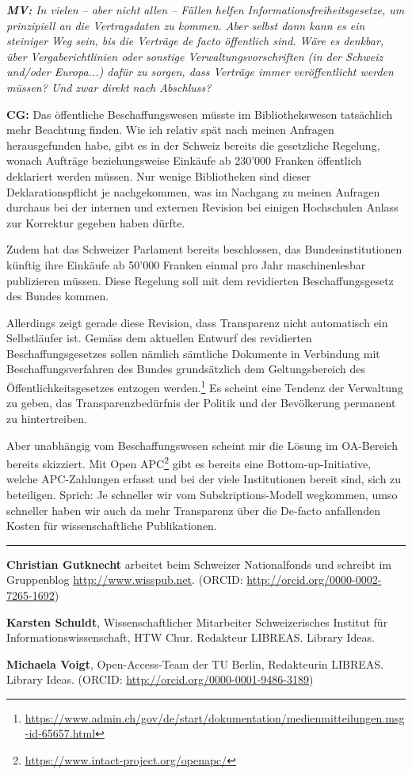 \documentclass[a4paper,
fontsize=11pt,
oneside,
numbers=noperiodatend,
parskip=half-,
bibliography=totoc,
final
]{scrartcl}
\begin{document}
\emph{\textbf{MV:} In vielen -- aber nicht allen -- Fällen helfen
Informationsfreiheitsgesetze, um prinzipiell an die Vertragsdaten zu
kommen. Aber selbst dann kann es ein steiniger Weg sein, bis die
Verträge de facto öffentlich sind. Wäre es denkbar, über
Vergaberichtlinien oder sonstige Verwaltungsvorschriften (in der Schweiz
und/oder Europa...) dafür zu sorgen, dass Verträge immer veröffentlicht
werden müssen? Und zwar direkt nach Abschluss?}

\textbf{CG:} Das öffentliche Beschaffungswesen müsste im
Bibliothekswesen tatsächlich mehr Beachtung finden. Wie ich relativ spät
nach meinen Anfragen herausgefunden habe, gibt es in der Schweiz bereits
die gesetzliche Regelung, wonach Aufträge beziehungsweise Einkäufe ab
230'000 Franken öffentlich deklariert werden müssen. Nur wenige
Bibliotheken sind dieser Deklarationspflicht je nachgekommen, was im
Nachgang zu meinen Anfragen durchaus bei der internen und externen
Revision bei einigen Hochschulen Anlass zur Korrektur gegeben haben
dürfte.

Zudem hat das Schweizer Parlament bereits beschlossen, das
Bundesinstitutionen künftig ihre Einkäufe ab 50'000 Franken einmal pro
Jahr maschinenlesbar publizieren müssen. Diese Regelung soll mit dem
revidierten Beschaffungsgesetz des Bundes kommen.

Allerdings zeigt gerade diese Revision, dass Transparenz nicht
automatisch ein Selbstläufer ist. Gemäss dem aktuellen Entwurf des
revidierten Beschaffungsgesetzes sollen nämlich sämtliche Dokumente in
Verbindung mit Beschaffungsverfahren des Bundes grundsätzlich dem
Geltungsbereich des Öffentlichkeitsgesetzes entzogen werden.\footnote{\url{https://www.admin.ch/gov/de/start/dokumentation/medienmitteilungen.msg-id-65657.html}}
Es scheint eine Tendenz der Verwaltung zu geben, das
Transparenzbedürfnis der Politik und der Bevölkerung permanent zu
hintertreiben.

Aber unabhängig vom Beschaffungswesen scheint mir die Lösung im
OA-Bereich bereits skizziert. Mit Open APC\footnote{\url{https://www.intact-project.org/openapc/}}
gibt es bereits eine Bottom-up-Initiative, welche APC-Zahlungen erfasst
und bei der viele Institutionen bereit sind, sich zu beteiligen. Sprich:
Je schneller wir vom Subskriptions-Modell wegkommen, umso schneller
haben wir auch da mehr Transparenz über die De-facto anfallenden Kosten
für wissenschaftliche Publikationen.

\begin{center}\rule{0.5\linewidth}{\linethickness}\end{center}

\textbf{Christian Gutknecht} arbeitet beim Schweizer Nationalfonds und
schreibt im Gruppenblog \url{http://www.wisspub.net}. (ORCID:
\url{http://orcid.org/0000-0002-7265-1692})

\textbf{Karsten Schuldt}, Wissenschaftlicher Mitarbeiter Schweizerisches
Institut für Informationswissenschaft, HTW Chur. Redakteur LIBREAS.
Library Ideas.

\textbf{Michaela Voigt}, Open-Access-Team der TU Berlin, Redakteurin
LIBREAS. Library Ideas. (ORCID:
\url{http://orcid.org/0000-0001-9486-3189})
\end{document}
